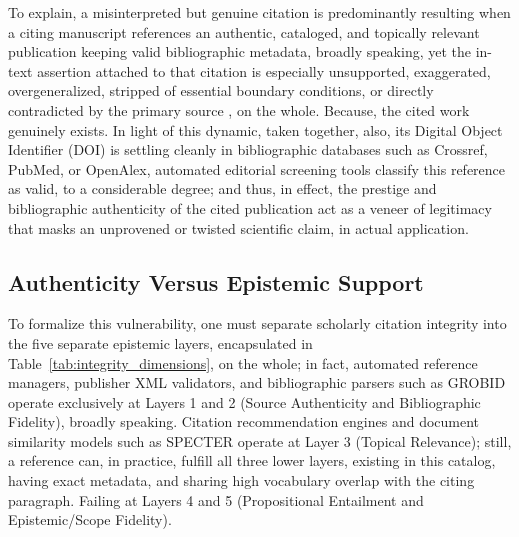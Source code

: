 \documentclass[sigconf]{acmart}
\begin{document}
To explain, a misinterpreted but genuine citation is predominantly resulting when a citing manuscript references an authentic, cataloged, and topically relevant publication keeping valid bibliographic metadata, broadly speaking, yet the in-text assertion attached to that citation is especially unsupported, exaggerated, overgeneralized, stripped of essential boundary conditions, or directly contradicted by the primary source \cite{greenberg2009citation,rekdal2014sinking,pavlovic2021accurate}, on the whole. Because, the cited work genuinely exists. In light of this dynamic, taken together, also, its Digital Object Identifier (DOI) is settling cleanly in bibliographic databases such as Crossref, PubMed, or OpenAlex, automated editorial screening tools classify this reference as valid, to a considerable degree; and thus, in effect, the prestige and bibliographic authenticity of the cited publication act as a veneer of legitimacy that masks an unprovened or twisted scientific claim, in actual application.

\subsection{Authenticity Versus Epistemic Support}
To formalize this vulnerability, one must separate scholarly citation integrity into the five separate epistemic layers, encapsulated in Table~\ref{tab:integrity_dimensions}, on the whole; in fact, automated reference managers, publisher XML validators, and bibliographic parsers such as GROBID \cite{lopez2009grobid} operate exclusively at Layers 1 and 2 (Source Authenticity and Bibliographic Fidelity), broadly speaking. Citation recommendation engines and document similarity models such as SPECTER \cite{cohan2020specter} operate at Layer 3 (Topical Relevance); still, a reference can, in practice, fulfill all three lower layers, existing in this catalog, having exact metadata, and sharing high vocabulary overlap with the citing paragraph. Failing at Layers 4 and 5 (Propositional Entailment and Epistemic/Scope Fidelity).
\end{document}
